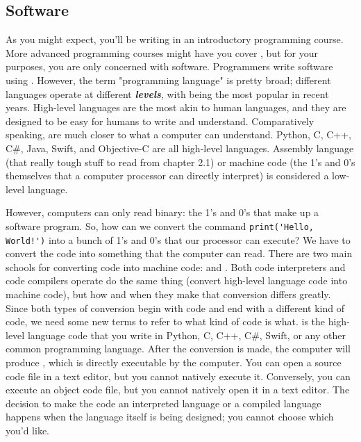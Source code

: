 \subsection{Software}
As you might expect, you'll be writing  in an introductory programming course. More advanced programming courses might have you cover , but for your purposes, you are only concerned with software. Programmers write software using . However, the term "programming language" is pretty broad; different languages operate at different \textbf{\textit{levels}}, with  being the most popular in recent years. High-level languages are the most akin to human languages, and they are designed to be easy for humans to write and understand. Comparatively speaking,  are much closer to what a computer can understand. Python, C, C++, C\#, Java, Swift, and Objective-C are all high-level languages. Assembly language (that really tough stuff to read from chapter 2.1) or machine code (the 1's and 0's themselves that a computer processor can directly interpret) is considered a low-level language.\par
However, computers can only read binary: the 1's and 0's that make up a software program. So, how can we convert the command \verb|print('Hello, World!')| into a bunch of 1's and 0's that our processor can execute? We have to convert the code into something that the computer can read. There are two main schools for converting code into machine code:  and . Both code interpreters and code compilers operate do the same thing (convert high-level language code into machine code), but how and when they make that conversion differs greatly. Since both types of conversion begin with code and end with a different kind of code, we need some new terms to refer to what kind of code is what.  is the high-level language code that you write in Python, C, C++, C\#, Swift, or any other common programming language. After the conversion is made, the computer will produce , which is directly executable by the computer. You can open a source code file in a text editor, but you cannot natively execute it. Conversely, you can execute an object code file, but you cannot natively open it in a text editor. The decision to make the code an interpreted language or a compiled language happens when the language itself is being designed; you cannot choose which you'd like.\par
